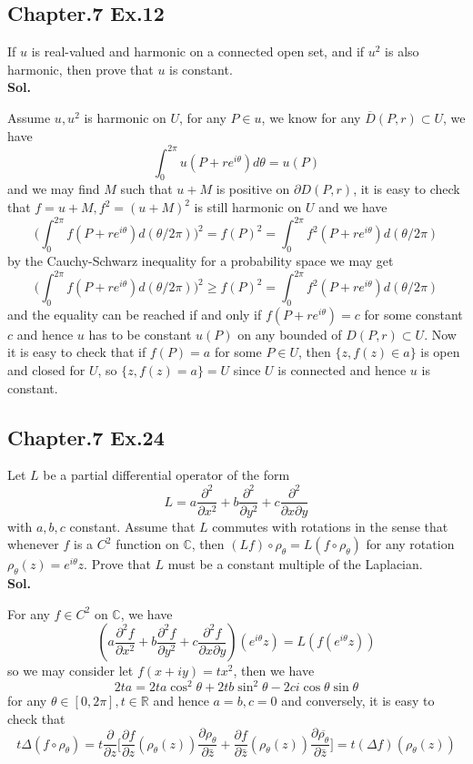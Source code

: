 \documentclass[lang=en,11pt,a4paper,citestyle =authoryear]{elegantpaper}
\newcommand{\R}{\mathbb{R}}
\newcommand{\C}{\mathbb{C}}
\begin{document}
\subsection*{Chapter.7 Ex.12} 
If $u$ is real-valued and harmonic on  a connected open set, and if $u^2$ is also harmonic, then prove that $u$ is constant.
\vspace{0.5em}\\
\textbf{Sol.} \par
Assume $u,u^2$ is harmonic on $U$, for any $P\in u$, we know for any $\overline{D}(P,r)\subset U$, we have
\[
\int_0^{2\pi} u(P+re^{i\theta}) d\theta  = u(P)
\] 
and we may find $M$ such that $u+M$ is positive on $\partial D(P,r)$, it is easy to check that $f = u+M, f^2 = (u+M)^2$ is still harmonic on $U$ and we have
\[
\Big(\int_0^{2\pi}f(P+re^{i\theta}) d(\theta/2\pi)\Big)^2 = f(P)^2 = \int_0^{2\pi} f^2(P+re^{i\theta})d(\theta/2\pi)
\]
by the Cauchy-Schwarz inequality for a probability space we may get
\[\Big(\int_0^{2\pi}f(P+re^{i\theta}) d(\theta/2\pi)\Big)^2 \geq f(P)^2 = \int_0^{2\pi} f^2(P+re^{i\theta})d(\theta/2\pi)\]
and the equality can be reached if and only if $f(P+re^{i\theta}) = c$ for some constant $c$ and hence $u$ has to be constant $u(P)$ on any bounded of $D(P,r) \subset U$. Now it is easy to check that if $f(P) = a$ for some $P\in U$, then $\{z,f(z)\in a\}$ is open and closed for $U$, so $\{z,f(z) = a\} = U$ since $U$ is connected and hence $u$ is constant.
\vspace{0.5em}

\subsection*{Chapter.7 Ex.24} 
Let $L$ be a partial differential operator of the form
\[L = a\dfrac{\partial^2}{\partial x^2}+b\dfrac{\partial^2}{\partial y^2}+c\dfrac{\partial^2}{\partial x\partial y}\]
with $a,b,c$ constant. Assume that $L$ commutes with rotations in the sense that whenever $f$ is a $C^2$ function on $\C$, then $(Lf)\circ \rho_{\theta} = L(f\circ \rho_{\theta})$ for any rotation $\rho_{\theta} (z) = e^{i\theta} z$. Prove that $L$ must be a constant multiple of the Laplacian.
\vspace{0.5em}\\
\textbf{Sol.} \par
For any $f\in C^2$ on $\C$, we have
\[
(a\dfrac{\partial^2 f}{\partial x^2}+b\dfrac{\partial^2 f}{\partial y^2}+c\dfrac{\partial^2 f}{\partial x\partial y})(e^{i\theta} z) = L(f(e^{i\theta} z))
\]
so we may consider let $f(x+iy) = tx^2$, then we have
\[
2ta= 2ta\cos^2\theta  + 2tb\sin^2\theta  - 2ci \cos\theta\sin\theta    
\]
for any $\theta \in [0,2\pi],t\in\R$ and hence $a = b, c=0$ and conversely, it is easy to check that
\[t\Delta (f\circ \rho_{\theta}) = t\dfrac{\partial}{\partial z}\Big[\dfrac{\partial f}{\partial z}(\rho_{\theta}(z))\dfrac{\partial \rho_{\theta}}{\partial \bar{z}}+\dfrac{\partial f}{\partial \bar{z}}(\rho_{\theta}(z))\dfrac{\partial \overline{\rho_{\theta}}}{\partial \bar{z}}\Big] = t(\Delta f)(\rho_{\theta}(z))\]
\vspace{0.5em}
\end{document}

